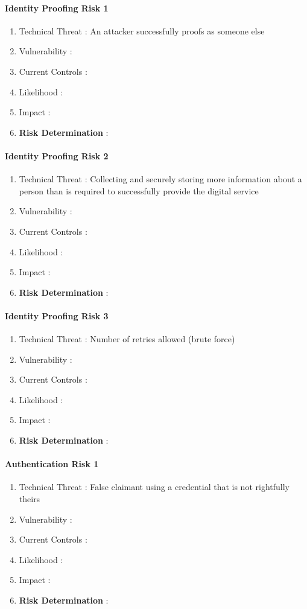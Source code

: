 \paragraph{Identity Proofing Risk 1}

\begin{enumerate}
	\item Technical Threat : An attacker successfully proofs as someone else
	\item Vulnerability :
	\item Current Controls : 
	\item Likelihood :
	\item Impact :
	\item \textbf{Risk Determination} : 
\end{enumerate}

\paragraph{Identity Proofing Risk 2}
\begin{enumerate}
	\item Technical Threat : Collecting and securely storing more information about a person than is required to successfully provide the digital service
	\item Vulnerability :
	\item Current Controls : 
	\item Likelihood :
	\item Impact :
	\item \textbf{Risk Determination} : 
\end{enumerate}

\paragraph{Identity Proofing Risk 3}
\begin{enumerate}
	\item Technical Threat : Number of retries allowed (brute force)
	\item Vulnerability :
	\item Current Controls : 
	\item Likelihood :
	\item Impact :
	\item \textbf{Risk Determination} : 
\end{enumerate}


\paragraph{Authentication Risk 1}
\begin{enumerate}
	\item Technical Threat : False claimant using a credential that is not rightfully theirs
	\item Vulnerability :
	\item Current Controls : 
	\item Likelihood :
	\item Impact :
	\item \textbf{Risk Determination} : 
\end{enumerate}

